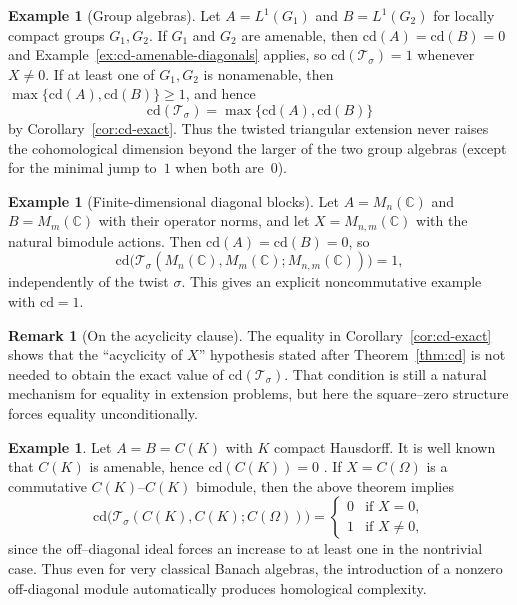 \documentclass{article}
\theoremstyle{plain}
\theoremstyle{definition}
\newtheorem{remark}[theorem]{Remark}
\newtheorem{example}[theorem]{Example}
\newcommand{\T}{\mathcal{T}}
\begin{document}
\begin{example}[Group algebras]\label{ex:cd-group}
Let $A=L^1(G_1)$ and $B=L^1(G_2)$ for locally compact groups $G_1,G_2$.
If $G_1$ and $G_2$ are amenable, then $\mathrm{cd}(A)=\mathrm{cd}(B)=0$ and
Example~\ref{ex:cd-amenable-diagonals} applies, so $\mathrm{cd}(\T_\sigma)=1$ whenever $X\neq 0$.
If at least one of $G_1,G_2$ is nonamenable, then
$\max\{\mathrm{cd}(A),\mathrm{cd}(B)\}\ge 1$, and hence
\[
\mathrm{cd}(\T_\sigma)=\max\{\mathrm{cd}(A),\mathrm{cd}(B)\}
\]
by Corollary~\ref{cor:cd-exact}.
Thus the twisted triangular extension never raises the cohomological dimension beyond
the larger of the two group algebras (except for the minimal jump to~$1$ when both are~$0$).
\end{example}

\begin{example}[Finite-dimensional diagonal blocks]\label{ex:cd-fd}
Let $A=M_n(\mathbb{C})$ and $B=M_m(\mathbb{C})$ with their operator norms, and
let $X=M_{n,m}(\mathbb{C})$ with the natural bimodule actions.
Then $\mathrm{cd}(A)=\mathrm{cd}(B)=0$, so
\[
\mathrm{cd}\bigl(\T_\sigma(M_n(\mathbb{C}),M_m(\mathbb{C});M_{n,m}(\mathbb{C}))\bigr)=1,
\]
independently of the twist $\sigma$.
This gives an explicit noncommutative example with $\mathrm{cd}=1$.
\end{example}








\begin{remark}[On the acyclicity clause]
The equality in Corollary~\ref{cor:cd-exact} shows that the “acyclicity of $X$” hypothesis
stated after Theorem~\ref{thm:cd} is not needed to obtain the exact value of $\mathrm{cd}(\T_\sigma)$.
That condition is still a natural mechanism for equality in extension problems, but here the
square--zero structure forces equality unconditionally.
\end{remark}






\begin{example}
Let $A=B=C(K)$ with $K$ compact Hausdorff.
It is well known that $C(K)$ is amenable, hence $\mathrm{cd}(C(K))=0$ \cite[§VII.2]{HelemskiiHomology}.
If $X=C(\Omega)$ is a commutative $C(K)$--$C(K)$ bimodule, then the above theorem implies
\[
\mathrm{cd}\bigl(\T_\sigma(C(K),C(K);C(\Omega))\bigr)=
\begin{cases}
0 & \text{if } X=0,\\
1 & \text{if } X\neq 0,
\end{cases}
\]
since the off--diagonal ideal forces an increase to at least one in the nontrivial case.
Thus even for very classical Banach algebras, the introduction of a nonzero off-diagonal module automatically produces homological complexity.
\end{example}
\end{document}
